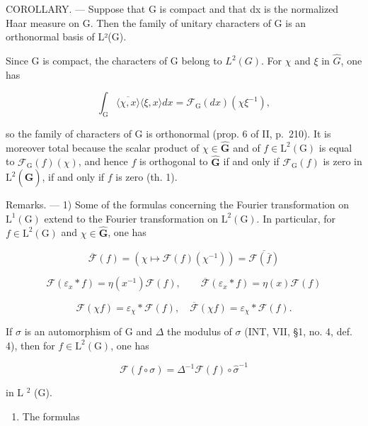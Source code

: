 COROLLARY. --- Suppose that G is compact and that dx is the normalized Haar measure on G. Then the family of unitary characters of G is an orthonormal basis of L²(G).

Since G is compact, the characters of G belong to \(L^{2}(G)\). For \(\chi\) and \(\xi\) in \(\widehat{G}\), one has

\[
\int_ {\mathrm{G}} \overline {{\langle \chi , x \rangle}} \langle \xi , x \rangle d x = \mathcal {F} _ {\mathrm{G}} (d x) (\chi \xi^ {- 1}),
\]

so the family of characters of G is orthonormal (prop. 6 of II, p.~210). It is moreover total because the scalar product of \(\chi \in \widehat{\mathbf{G}}\) and of \(f \in \mathrm{L}^2(\mathrm{G})\) is equal to \(\mathcal{F}_{\mathrm{G}}(f)(\chi)\), and hence \(f\) is orthogonal to \(\widehat{\mathbf{G}}\) if and only if \(\mathcal{F}_{\mathrm{G}}(f)\) is zero in \(\mathrm{L}^2(\widehat{\mathbf{G}})\), if and only if \(f\) is zero (th. 1).

Remarks. --- 1) Some of the formulas concerning the Fourier transformation on \(\mathrm{L}^{1}(\mathrm{G})\) extend to the Fourier transformation on \(\mathrm{L}^{2}(\mathrm{G})\). In particular, for \(f \in \mathrm{L}^{2}(\mathrm{G})\) and \(\chi \in \widehat{\mathbf{G}}\), one has

\[
\overline {{\mathcal {F}}} (f) = (\chi \mapsto \mathcal {F} (f) (\chi^ {- 1})) = \overline {{\mathcal {F} (\overline {{f}})}}
\]

\[
\mathcal {F} (\varepsilon_ {x} * f) = \eta (x ^ {- 1}) \mathcal {F} (f), \qquad \overline {{\mathcal {F}}} (\varepsilon_ {x} * f) = \eta (x) \mathcal {F} (f)
\]

\[
\mathcal {F} (\chi f) = \varepsilon_ {\chi} * \mathcal {F} (f), \quad \overline {{\mathcal {F}}} (\chi f) = \varepsilon_ {\chi} * \mathcal {F} (f).
\]

If \(\sigma\) is an automorphism of G and \(\Delta\) the modulus of \(\sigma\) (INT, VII, §1, no. 4, def. 4), then for \(f \in \mathrm{L}^2(\mathrm{G})\), one has

\[
\mathcal {F} (f \circ \sigma) = \Delta^ {- 1} \mathcal {F} (f) \circ \widehat {\sigma} ^ {- 1}
\]

in L \(^{2}\) (G).

\begin{enumerate}
\def\labelenumi{\arabic{enumi})}
\setcounter{enumi}{1}
\tightlist
\item
  The formulas
\end{enumerate}

